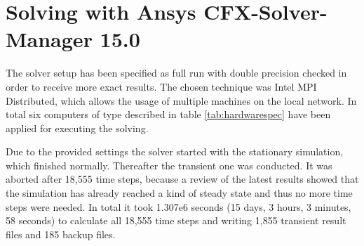\section{Solving with Ansys CFX-Solver-Manager 15.0}
The solver setup has been specified as full run with double 
precision checked in order to receive more exact results. The chosen technique was Intel MPI Distributed, which allows the usage of multiple machines on the local network. In total six computers of type described in table \ref{tab:hardwarespec} have been applied for executing the solving.

Due to the provided settings the solver started with the stationary simulation, which finished normally. Thereafter the transient one was conducted. It was aborted after 18,555 time steps, because a review of the latest results showed that the simulation has already reached a kind of steady state and thus no more time steps were needed. In total it took 1.307e6 seconds (15 days, 3 hours, 3 minutes, 58 seconds) to calculate all 18,555 time steps and writing 1,855 transient result files and 185 backup files.